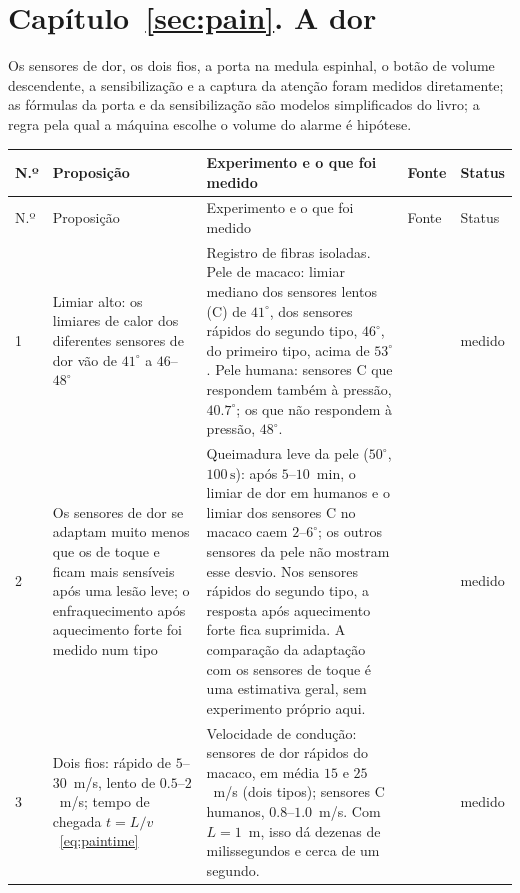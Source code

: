\section{Capítulo~\ref{sec:pain}. A dor}

Os sensores de dor, os dois fios, a porta na medula espinhal, o botão de volume descendente, a sensibilização e a captura da atenção foram medidos diretamente; as fórmulas da porta e da sensibilização são modelos simplificados do livro; a regra pela qual a máquina escolhe o volume do alarme é hipótese.

{\footnotesize
\setlength{\tabcolsep}{3pt}\renewcommand{\arraystretch}{1.15}
\begin{longtable}{>{\raggedright}p{0.5cm}>{\raggedright}p{4.0cm}>{\raggedright}p{5.6cm}>{\raggedright}p{2.3cm}>{\raggedright\arraybackslash}p{1.7cm}}
\toprule
N.º & Proposição & Experimento e o que foi medido & Fonte & Status \\
\midrule\endfirsthead
\toprule
N.º & Proposição & Experimento e o que foi medido & Fonte & Status \\
\midrule\endhead
1 & Limiar alto: os limiares de calor dos diferentes sensores de dor vão de $41^\circ$ a $46$--$48^\circ$ & Registro de fibras isoladas. Pele de macaco: limiar mediano dos sensores lentos (C) de $41^\circ$, dos sensores rápidos do segundo tipo, $46^\circ$, do primeiro tipo, acima de $53^\circ$. Pele humana: sensores C que respondem também à pressão, $40.7^\circ$; os que não respondem à pressão, $48^\circ$. & \cite{Treede1995heat, Weidner1999cfib} & medido \\
2 & Os sensores de dor se adaptam muito menos que os de toque e ficam mais sensíveis após uma lesão leve; o enfraquecimento após aquecimento forte foi medido num tipo & Queimadura leve da pele ($50^\circ$, $100\,\text{s}$): após $5$--$10$~min, o limiar de dor em humanos e o limiar dos sensores C no macaco caem $2$--$6^\circ$; os outros sensores da pele não mostram esse desvio. Nos sensores rápidos do segundo tipo, a resposta após aquecimento forte fica suprimida. A comparação da adaptação com os sensores de toque é uma estimativa geral, sem experimento próprio aqui. & \cite{LaMotte1982hyper, Treede1995heat} & medido \\
3 & Dois fios: rápido de $5$--$30$~m/s, lento de $0.5$--$2$~m/s; tempo de chegada $t=L/v$~\eqref{eq:paintime} & Velocidade de condução: sensores de dor rápidos do macaco, em média $15$ e $25$~m/s (dois tipos); sensores C humanos, $0.8$--$1.0$~m/s. Com $L=1$~m, isso dá dezenas de milissegundos e cerca de um segundo. & \cite{Treede1995heat, Weidner1999cfib} & medido \\

\end{longtable}}
